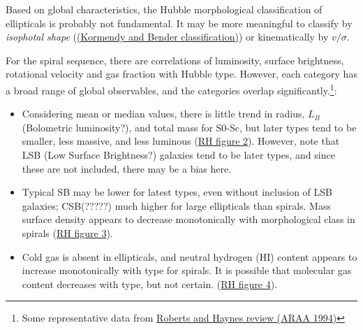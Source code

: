\documentclass{article}
\newcommand{\mynotes}[1]{\textcolor{cadmiumorange}{#1}}
\begin{document}
Based on global characteristics, the Hubble morphological classification of
ellipticals is probably not fundamental. It may be more meaningful to classify
by \emph{isophotal shape}
(\href{http://astronomy.as.virginia.edu}{(Kormendy and Bender classification)})
or kinematically by $v/\sigma$.

For the spiral sequence, there are correlations of luminosity, surface
brightness, rotational velocity and gas fraction with Hubble type. However,
each category has a broad range of global observables, and the categories overlap
significantly.\footnote{Some representative data from
\href{http://adsabs.harvard.edu/cgi-bin/nph-bib_query?bibcode=1994ARA\%26A..32..115}
{Roberts and Haynes review (ARAA 1994)}}:
\begin{itemize}
    \item Considering mean or median values, there is little trend in
        radius, $L_{B}$ \mynotes{(Bolometric luminosity?)},
        and total mass for S0-Sc, but later types tend
        to be smaller, less massive, and less luminous
        (\href{http://astronomy.nmsu.edu/holtz/a555/html/diagrams/a616/rh2.htm}
        {{RH figure 2}}).
        However, note that LSB \mynotes{(Low Surface Brightness?)}
        galaxies tend to be later types, and
        since these are not included, there may be a bias here.
    \item Typical SB may be lower for latest types, even without inclusion
        of LSB galaxies; CSB(?????) much higher for large ellipticals than
        spirals. Mass surface density appears to decrease monotonically with
        morphological class in spirals
        (\href{http://astronomy.nmsu.edu/holtz/a555/html/diagrams/a616/rh3.htm}
        {{RH figure 3}}).
    \item Cold gas is absent in ellipticals, and neutral hydrogen (HI) content
        appears to increase monotonically with type for spirals. It is possible
        that molecular gas content decreases with type, but not certain.
        (\href{http://astronomy.nmsu.edu/holtz/a555/html/diagrams/a616/rh4.htm}
        {{RH figure 4}}).
\end{itemize}
\end{document}
